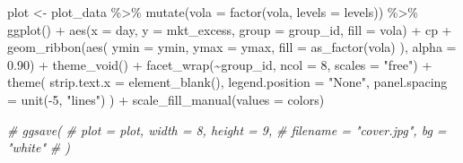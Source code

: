 \documentclass[
]{krantz}
\newenvironment{Shaded}{\begin{snugshade}}{\end{snugshade}}
\newcommand{\AttributeTok}[1]{\textcolor[rgb]{0.61,0.61,0.61}{#1}}
\newcommand{\CommentTok}[1]{\textcolor[rgb]{0.37,0.37,0.37}{\textit{#1}}}
\newcommand{\DecValTok}[1]{\textcolor[rgb]{0.06,0.06,0.06}{#1}}
\newcommand{\FloatTok}[1]{\textcolor[rgb]{0.06,0.06,0.06}{#1}}
\newcommand{\FunctionTok}[1]{\textcolor[rgb]{0,0,0}{#1}}
\newcommand{\NormalTok}[1]{#1}
\newcommand{\OtherTok}[1]{\textcolor[rgb]{0.37,0.37,0.37}{#1}}
\newcommand{\SpecialCharTok}[1]{\textcolor[rgb]{0,0,0}{#1}}
\newcommand{\StringTok}[1]{\textcolor[rgb]{0.5,0.5,0.5}{#1}}
\begin{document}
\begin{Shaded}
\begin{Highlighting}[]
\NormalTok{plot }\OtherTok{\textless{}{-}}\NormalTok{ plot\_data }\SpecialCharTok{\%\textgreater{}\%}
  \FunctionTok{mutate}\NormalTok{(}\AttributeTok{vola =} \FunctionTok{factor}\NormalTok{(vola, }\AttributeTok{levels =}\NormalTok{ levels)) }\SpecialCharTok{\%\textgreater{}\%}
  \FunctionTok{ggplot}\NormalTok{() }\SpecialCharTok{+}
  \FunctionTok{aes}\NormalTok{(}\AttributeTok{x =}\NormalTok{ day, }\AttributeTok{y =}\NormalTok{ mkt\_excess, }\AttributeTok{group =}\NormalTok{ group\_id, }\AttributeTok{fill =}\NormalTok{ vola) }\SpecialCharTok{+}
\NormalTok{  cp }\SpecialCharTok{+}
  \FunctionTok{geom\_ribbon}\NormalTok{(}\FunctionTok{aes}\NormalTok{(}
    \AttributeTok{ymin =}\NormalTok{ ymin,}
    \AttributeTok{ymax =}\NormalTok{ ymax,}
    \AttributeTok{fill =} \FunctionTok{as\_factor}\NormalTok{(vola)}
\NormalTok{  ), }\AttributeTok{alpha =} \FloatTok{0.90}\NormalTok{) }\SpecialCharTok{+}
  \FunctionTok{theme\_void}\NormalTok{() }\SpecialCharTok{+}
  \FunctionTok{facet\_wrap}\NormalTok{(}\SpecialCharTok{\textasciitilde{}}\NormalTok{group\_id, }\AttributeTok{ncol =} \DecValTok{8}\NormalTok{, }\AttributeTok{scales =} \StringTok{"free"}\NormalTok{) }\SpecialCharTok{+}
  \FunctionTok{theme}\NormalTok{(}
    \AttributeTok{strip.text.x =} \FunctionTok{element\_blank}\NormalTok{(),}
    \AttributeTok{legend.position =} \StringTok{"None"}\NormalTok{,}
    \AttributeTok{panel.spacing =} \FunctionTok{unit}\NormalTok{(}\SpecialCharTok{{-}}\DecValTok{5}\NormalTok{, }\StringTok{"lines"}\NormalTok{)}
\NormalTok{  ) }\SpecialCharTok{+}
  \FunctionTok{scale\_fill\_manual}\NormalTok{(}\AttributeTok{values =}\NormalTok{ colors)}

\CommentTok{\# ggsave(}
\CommentTok{\#   plot = plot, width = 8, height = 9,}
\CommentTok{\#   filename = "cover.jpg", bg = "white"}
\CommentTok{\# )}
\end{Highlighting}
\end{Shaded}


  

\printindex
\end{document}
